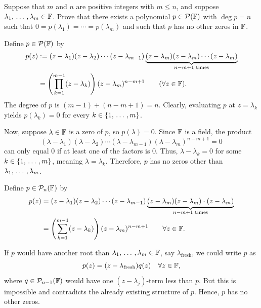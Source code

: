 \begin{xrcs}
  Suppose that $m$ and $n$ are positive integers with $m \leq n$, and suppose $\lambda_1, {\, \ldots \,\,}, \lambda_m \in \mathbb{F}$. Prove that there exists a polynomial $p \in \mathcal{P}(\mathbb{F})$ with $\deg p = n$ such that $0 = p(\lambda_1) = \cdots = p(\lambda_m)$ and such that $p$ has no other zeros in $\mathbb{F}$.

  \begin{xprf}
    Define $p \in \mathcal{P}(\mathbb{F})$ by
    \begin{equation}
      \begin{aligned}
        p(z) &:= (z-\lambda_1)(z-\lambda_2)\cdots(z-\lambda_{m-1}) \underbrace{(z-\lambda_m)(z-\lambda_m)\cdots(z-\lambda_m)}_{n-m+1 \text{ times}} \\
             &= \left(\prod_{k = 1}^{m-1} (z-\lambda_k) \right) (z-\lambda_m)^{n-m+1} \qquad (\forall z \in \mathbb{F}).
      \end{aligned}
    \end{equation}
    The degree of $p$ is $(m-1) + (n-m+1) = n$.
    Clearly, evaluating $p$ at $z = \lambda_k$ yields $p(\lambda_k) = 0$ for every $k \in \{1, {\, \ldots \,\,}, m\}$.

    Now, suppose $\lambda \in \mathbb{F}$ is a zero of $p$, so $p(\lambda) = 0$. Since $\mathbb{F}$ is a field, the product
    \[
      (\lambda-\lambda_1)(\lambda-\lambda_2)\cdots(\lambda-\lambda_{m-1})(\lambda-\lambda_m)^{n-m+1} = 0
    \]
    can only equal $0$ if at least one of the factors is $0$.
    Thus, $\lambda - \lambda_k = 0$ for some $k \in \{1, {\, \ldots \,\,}, m\}$, meaning $\lambda = \lambda_k$.
    Therefore, $p$ has no zeros other than $\lambda_1, {\, \ldots \,\,}, \lambda_m$.
  \end{xprf}

  \begin{failedattempt}
    Define $p \in \mathcal{P}_n (\mathbb{F})$ by
    \begin{equation}
      \begin{aligned}
        p (z)
          &= (z-\lambda_1) (z-\lambda_2) \cdots (z-\lambda_{m-1}) \underbrace{(z-\lambda_m)(z-\lambda_m)\cdot(z-\lambda_m)}_{n-m+1 \text{ times}} \\
          &= \left(\sum_{k = 1}^{m-1} (z-\lambda_k) \right) (z-\lambda_m)^{n-m+1} \qquad \forall z \in \mathbb{F}.
      \end{aligned}
    \end{equation}

    If $p$ would have another root than $\lambda_1, {\, \ldots \,\,}, \lambda_m \in \mathbb{F}$, say $\lambda_{\text{fresh}}$, we could write $p$ as
    \begin{equation}
      p(z) = (z- \lambda_{\text{fresh}}) q(z) \quad \forall z \in \mathbb{F},
    \end{equation}
    where $q \in \mathcal{P}_{n-1} (\mathbb{F})$ would have one $(z-\lambda_j)$-term less than $p$. But this is impossible and contradicts the already existing structure of $p$. Hence, $p$ has no other zeros.
  \end{failedattempt}


\end{xrcs}
